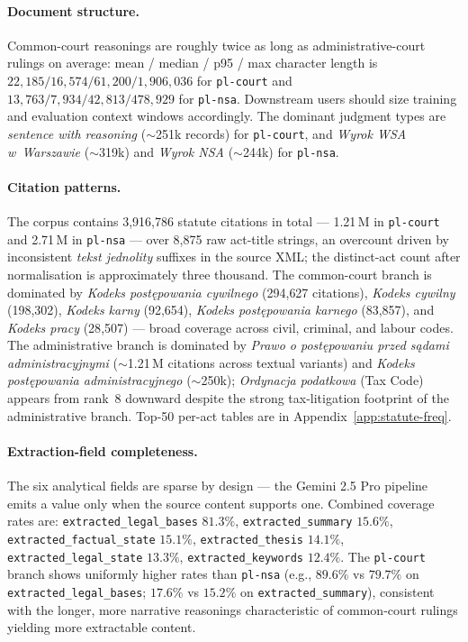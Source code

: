 \documentclass{article}
\begin{document}
\paragraph{Document structure.} Common-court reasonings are roughly twice as long as administrative-court rulings on average: mean / median / p95 / max character length is $22{,}185 / 16{,}574 / 61{,}200 / 1{,}906{,}036$ for \texttt{pl-court} and $13{,}763 / 7{,}934 / 42{,}813 / 478{,}929$ for \texttt{pl-nsa}. Downstream users should size training and evaluation context windows accordingly. The dominant judgment types are \emph{sentence with reasoning} ($\sim$251k records) for \texttt{pl-court}, and \emph{Wyrok WSA w~Warszawie} ($\sim$319k) and \emph{Wyrok NSA} ($\sim$244k) for \texttt{pl-nsa}.

\paragraph{Citation patterns.} The corpus contains 3{,}916{,}786 statute citations in total --- 1.21\,M in \texttt{pl-court} and 2.71\,M in \texttt{pl-nsa} --- over 8{,}875 raw act-title strings, an overcount driven by inconsistent \emph{tekst jednolity} suffixes in the source XML; the distinct-act count after normalisation is approximately three thousand. The common-court branch is dominated by \emph{Kodeks postępowania cywilnego} (294{,}627 citations), \emph{Kodeks cywilny} (198{,}302), \emph{Kodeks karny} (92{,}654), \emph{Kodeks postępowania karnego} (83{,}857), and \emph{Kodeks pracy} (28{,}507) --- broad coverage across civil, criminal, and labour codes. The administrative branch is dominated by \emph{Prawo o postępowaniu przed sądami administracyjnymi} ($\sim$1.21\,M citations across textual variants) and \emph{Kodeks postępowania administracyjnego} ($\sim$250k); \emph{Ordynacja podatkowa} (Tax Code) appears from rank~8 downward despite the strong tax-litigation footprint of the administrative branch. Top-50 per-act tables are in Appendix~\ref{app:statute-freq}.

\paragraph{Extraction-field completeness.} The six analytical fields are sparse by design --- the Gemini 2.5 Pro pipeline emits a value only when the source content supports one. Combined coverage rates are: \texttt{extracted\_legal\_bases} $81.3\%$, \texttt{extracted\_summary} $15.6\%$, \texttt{extracted\_factual\_state} $15.1\%$, \texttt{extracted\_thesis} $14.1\%$, \texttt{extracted\_legal\_state} $13.3\%$, \texttt{extracted\_keywords} $12.4\%$. The \texttt{pl-court} branch shows uniformly higher rates than \texttt{pl-nsa} (e.g., $89.6\%$ vs $79.7\%$ on \texttt{extracted\_legal\_bases}; $17.6\%$ vs $15.2\%$ on \texttt{extracted\_summary}), consistent with the longer, more narrative reasonings characteristic of common-court rulings yielding more extractable content.
\end{document}

